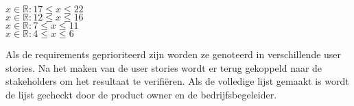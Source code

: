 \whitespace
{} $ x \in \mathbb{R} : 17 \leq x \leq 22 $ \\
 $ x \in \mathbb{R} : 12 \leq x \leq 16 $ \\
 $x \in \mathbb{R} : 7 \leq x \leq 11$ \\
 $x \in \mathbb{R} : 4 \leq x \leq 6$

\whitespace
Als de requirements geprioriteerd zijn worden ze genoteerd in verschillende user stories.
Na het maken van de user stories wordt er terug gekoppeld naar de stakeholders om het resultaat te verifiëren.
Als de volledige lijst gemaakt is wordt de lijst gecheckt door de product owner en de bedrijfsbegeleider.

